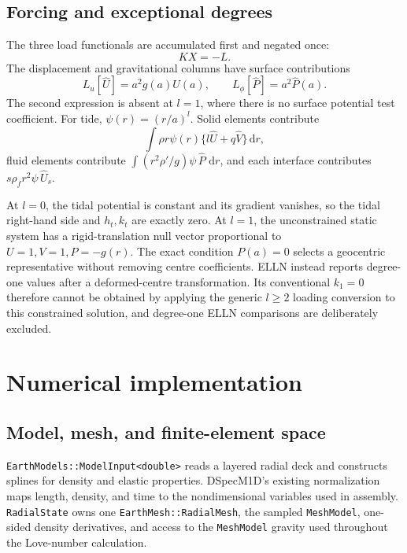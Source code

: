 \documentclass[11pt,a4paper]{article}
\newcommand{\code}[1]{\texttt{#1}}
\newcommand{\dd}{\,\mathrm{d}}
\begin{document}
\subsection{Forcing and exceptional degrees}

The three load functionals are accumulated first and negated once:
\begin{equation}
 KX=-L. \label{eq:load-sign}
\end{equation}
The displacement and gravitational columns have surface contributions
\begin{equation}
 L_u[\widehat U]=a^2g(a)\widehat U(a),\qquad
 L_\phi[\widehat P]=a^2\widehat P(a). \label{eq:surface-loads}
\end{equation}
The second expression is absent at \(l=1\), where there is no surface
potential test coefficient.  For tide, \(\psi(r)=(r/a)^l\).  Solid elements
contribute
\begin{equation}
 \int \rho r\psi(r)\{l\widehat U+q\widehat V\}\dd r,
\end{equation}
fluid elements contribute
\(\int (r^2\rho'/g)\psi\,\widehat P\,\dd r\), and each interface contributes
\(s\rho_f r^2\psi\,\widehat U_s\).

At \(l=0\), the tidal potential is constant and its gradient vanishes, so the
tidal right-hand side and \(h_t,k_t\) are exactly zero.  At \(l=1\), the
unconstrained static system has a rigid-translation null vector proportional
to \(U=1,V=1,P=-g(r)\).  The exact condition \(P(a)=0\) selects a geocentric
representative without removing centre coefficients.  ELLN instead reports
degree-one values after a deformed-centre transformation.  Its conventional
\(k_1=0\) therefore cannot be obtained by applying the generic
\(l\geq2\) loading conversion to this constrained solution, and degree-one
ELLN comparisons are deliberately excluded.

\section{Numerical implementation}

\subsection{Model, mesh, and finite-element space}

\code{EarthModels::ModelInput<double>} reads a layered radial deck and
constructs splines for density and elastic properties.  DSpecM1D's existing
normalization maps length, density, and time to the nondimensional variables
used in assembly.  \code{RadialState} owns one
\code{EarthMesh::RadialMesh}, the sampled \code{MeshModel}, one-sided
density derivatives, and access to the \code{MeshModel} gravity used
throughout the Love-number calculation.
\end{document}
